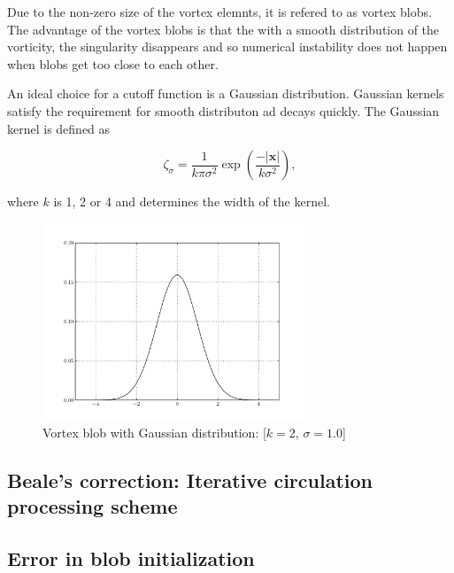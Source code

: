 Due to the non-zero size of the vortex elemnts, it is refered to as vortex blobs. The advantage of the vortex blobs is that the with a smooth distribution of the vorticity, the singularity disappears and so numerical instability does not happen when blobs get too close to each other. 

An ideal choice for a cutoff function is a Gaussian distribution. Gaussian kernels satisfy the requirement for smooth distributon ad decays quickly. The Gaussian kernel is defined as

\begin{equation}
\zeta_{\sigma} = \frac{1}{k\pi\sigma^2}\exp\left(\frac{-\left|\mathbf{x}\right|}{k\sigma^2}\right),
\end{equation}

where $k$ is 1, 2 or 4 and determines the width of the kernel.

\begin{figure}
	\centering
	\includegraphics[width=0.7\textwidth]{figures/lagrangian/gaussianKernel.pdf}
	\caption{Vortex blob with Gaussian distribution: [$k=2$, $\sigma=1.0$]}
\end{figure}


\subsection{Beale's correction: Iterative circulation processing scheme}


\subsection{Error in blob initialization}

